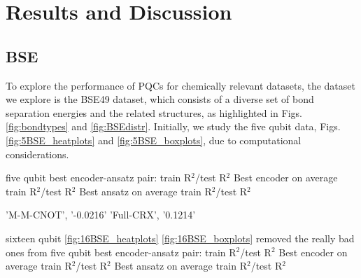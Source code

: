 \documentclass[journal=jacsat,manuscript=article]{achemso}
\begin{document}
\section{Results and Discussion}
\label{section:results_and_discussion}


\subsection{BSE}
To explore the performance of PQCs for chemically relevant datasets, the dataset we explore is the BSE49 dataset, which consists of a diverse set of bond separation energies and the related structures, as highlighted in Figs. \ref{fig:bondtypes} and \ref{fig:BSEdistr}.
Initially, we study the five qubit data, Figs. \ref{fig:5BSE_heatplots} and \ref{fig:5BSE_boxplots}, due to computational considerations.



five qubit 
best encoder-ansatz pair: train R$^{2}$/test R$^{2}$
Best encoder on average train R$^{2}$/test R$^{2}$
Best ansatz on average train R$^{2}$/test R$^{2}$

'M-M-CNOT', '-0.0216'
'Full-CRX', '0.1214'

sixteen qubit \ref{fig:16BSE_heatplots} \ref{fig:16BSE_boxplots}
removed the really bad ones from five qubit
best encoder-ansatz pair: train R$^{2}$/test R$^{2}$
Best encoder on average train R$^{2}$/test R$^{2}$
Best ansatz on average train R$^{2}$/test R$^{2}$
\end{document}
